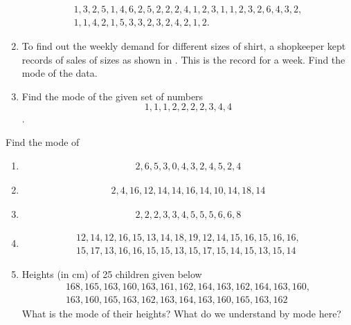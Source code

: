 \begin{enumerate}[label=\thesection.\arabic*, ref=\thesection.\theenumi]
\begin{gather*}
	1,3,2,5,1,4,6,2,5,2,2,2,4,1,2,3,1,1,2,3,2,6,4,3,2,
	\\
	1,1,4,2,1,5,3,3,2,3,2,4,2,1,2.
	\end{gather*}
	\solution

\item To find out the weekly demand for different sizes of shirt, a shopkeeper kept records of sales of sizes as shown in 
.  This is the record for a week.  Find the mode of the data.
	\begin{table}[H]
  \centering
  
  \caption{}
  \label{tab:shirt}
\end{table}
\item Find the mode of the given set of numbers
	$$1,1,1,2,2,2,2,3,4,4$$.
\end{enumerate}
Find the mode of
\begin{enumerate}[label=\thesection.\arabic*, ref=\thesection.\theenumi,resume*]
\item 	
		\begin{gather*}
		2,6,5,3,0,4,3,2,4,5,2,4
	\end{gather*}
\item 
		\begin{gather*}
		2,4,16,12,14,14,16,14,10,14,18,14
	\end{gather*}
	\item 
		\begin{gather*}
		2,2,2,3,3,4,5,5,5,6,6,8
	\end{gather*}
	\item 
		\begin{gather*}
		12, 14, 12, 16, 15, 13, 14, 18, 19, 12, 14, 15, 16, 15, 16, 16,
	\\
		15, 17, 13, 16, 16, 15, 15, 13, 15, 17, 15, 14, 15, 13, 15, 14
		\end{gather*}
	\item Heights (in cm) of 25 children given below
		\begin{gather*}
		168, 165, 163, 160, 163, 161, 162, 164, 163, 162,
164, 163,	160, 
		\\
	 163, 160, 165, 163, 162, 163, 164, 163, 160, 165, 163, 162 
	\end{gather*}
		What is the mode of their heights? What do we understand by mode here?
\end{enumerate}
